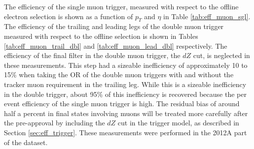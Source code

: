 %
%

The efficiency of the single muon trigger, measured
with respect to the offline electron selection is shown
as a function of $p_T$ and $\eta$ in Table \ref{tab:eff_muon_sgl}.
The efficiency of the trailing and leading legs of the double muon trigger
measured with respect to the offline selection is shown
in Tables \ref{tab:eff_muon_trail_dbl} and \ref{tab:eff_muon_lead_dbl} respectively.
The efficiency of the final filter in the double muon trigger, the $dZ$ cut,
is neglected in these measurements.  This step had a sizeable inefficiency of
approximately 10 to 15\% when taking the OR of the double muon triggers with and
without the tracker muon requirement in the trailing leg. While this is a sizeable
inefficiency in the double trigger, about 95\% of this inefficiency is recovered
because the per event efficiency of the single muon trigger is high.
The residual bias of around half a percent in final states involving muons will
be treated more carefully after the pre-approval by including the $dZ$ cut in 
the trigger model, as described in Section \ref{sec:eff_trigger}.
These measurements were performed in the 2012A part of the dataset.

